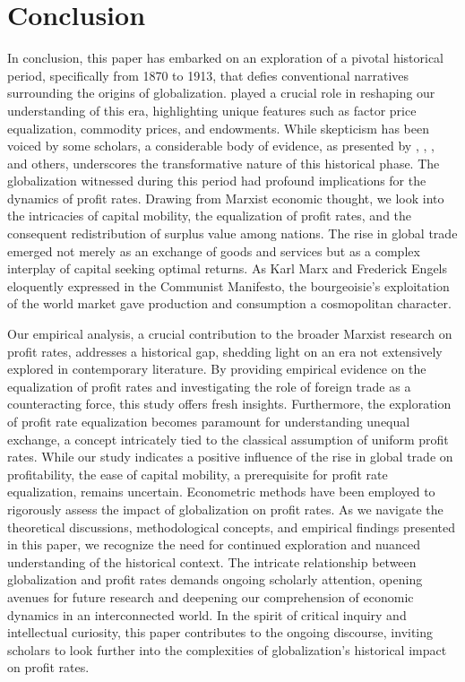\documentclass[10pt]{article}
\begin{document}
\section{Conclusion}
In conclusion, this paper has embarked on an exploration of a pivotal historical period, specifically from 1870 to 1913, that defies conventional narratives surrounding the origins of globalization. \citet{ORourke2002} played a crucial role in reshaping our understanding of this era, highlighting unique features such as factor price equalization, commodity prices, and endowments. While skepticism has been voiced by some scholars, a considerable body of evidence, as presented by \citet{Estevadeordal2003}, \citet{KlasingMilionis2014}, \citet{JacksMeissnerNovy2011}, and others, underscores the transformative nature of this historical phase. The globalization witnessed during this period had profound implications for the dynamics of profit rates. Drawing from Marxist economic thought, we look into the intricacies of capital mobility, the equalization of profit rates, and the consequent redistribution of surplus value among nations. The rise in global trade emerged not merely as an exchange of goods and services but as a complex interplay of capital seeking optimal returns. As Karl Marx and Frederick Engels eloquently expressed in the Communist Manifesto, the bourgeoisie's exploitation of the world market gave production and consumption a cosmopolitan character.
\par Our empirical analysis, a crucial contribution to the broader Marxist research on profit rates, addresses a historical gap, shedding light on an era not extensively explored in contemporary literature. By providing empirical evidence on the equalization of profit rates and investigating the role of foreign trade as a counteracting force, this study offers fresh insights. Furthermore, the exploration of profit rate equalization becomes paramount for understanding unequal exchange, a concept intricately tied to the classical assumption of uniform profit rates. While our study indicates a positive influence of the rise in global trade on profitability, the ease of capital mobility, a prerequisite for profit rate equalization, remains uncertain. Econometric methods have been employed to rigorously assess the impact of globalization on profit rates. As we navigate the theoretical discussions, methodological concepts, and empirical findings presented in this paper, we recognize the need for continued exploration and nuanced understanding of the historical context. The intricate relationship between globalization and profit rates demands ongoing scholarly attention, opening avenues for future research and deepening our comprehension of economic dynamics in an interconnected world. In the spirit of critical inquiry and intellectual curiosity, this paper contributes to the ongoing discourse, inviting scholars to look further into the complexities of globalization's historical impact on profit rates.
\end{document}
